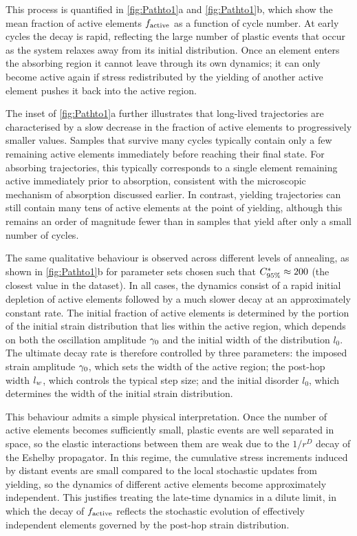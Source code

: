 This process is quantified in \cref{fig:Pathto1}a and \cref{fig:Pathto1}b, which show the mean fraction of active elements $f_{\mathrm{active}}$ as a function of cycle number. At early cycles the decay is rapid, reflecting the large number of plastic events that occur as the system relaxes away from its initial distribution. Once an element enters the absorbing region it cannot leave through its own dynamics; it can only become active again if stress redistributed by the yielding of another active element pushes it back into the active region.

The inset of \cref{fig:Pathto1}a further illustrates that long-lived trajectories are characterised by a slow decrease in the fraction of active elements to
progressively smaller values. Samples that survive many cycles typically contain only a few remaining active elements immediately before reaching their final state. For absorbing trajectories, this typically corresponds to a single element remaining active immediately prior to absorption, consistent with the microscopic mechanism of absorption discussed earlier. In contrast, yielding trajectories can still contain many tens of active elements at the point of yielding, although this remains an order of magnitude fewer than in samples that yield after only a small number of cycles.

The same qualitative behaviour is observed across different levels of annealing, as shown in \cref{fig:Pathto1}b for parameter sets chosen such that $C^\ast_{95\%} \approx 200$ (the closest value in the dataset). In all cases, the dynamics consist of a rapid initial depletion of active elements followed by a much slower decay at an approximately constant rate. The initial fraction of active elements is determined by the portion of the initial strain distribution that lies within the active region, which depends on both the oscillation amplitude $\gamma_0$ and the initial width of the distribution $l_0$. The ultimate decay rate is therefore controlled by three parameters: the imposed strain amplitude $\gamma_0$, which sets the width of the active region; the post-hop width $l_w$, which controls the typical step size; and the initial disorder $l_0$, which determines the width of the initial strain distribution.

This behaviour admits a simple physical interpretation. Once the number of active elements becomes sufficiently small, plastic events are well separated in space, so the elastic interactions between them are weak due to the $1/r^D$ decay of the Eshelby propagator. In this regime, the cumulative stress increments induced by distant events are small compared to the local stochastic updates from yielding, so the dynamics of different active elements become approximately independent. This justifies treating the late-time dynamics in a dilute limit, in which the decay of $f_{\mathrm{active}}$ reflects the stochastic evolution of effectively independent elements governed by the post-hop strain distribution.

